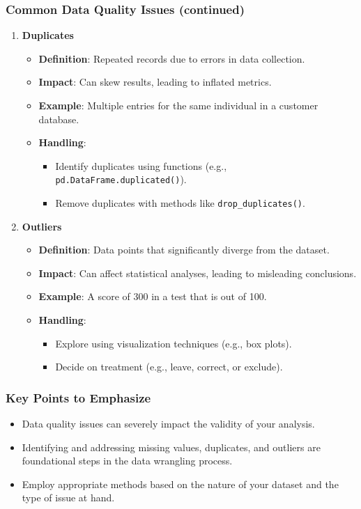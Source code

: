 \documentclass[aspectratio=169]{beamer}
\begin{document}
\begin{frame}[fragile]
    \frametitle{Common Data Quality Issues (continued)}
    \begin{enumerate}[resume]
        \item \textbf{Duplicates}
        \begin{itemize}
            \item \textbf{Definition}: Repeated records due to errors in data collection.
            \item \textbf{Impact}: Can skew results, leading to inflated metrics.
            \item \textbf{Example}: Multiple entries for the same individual in a customer database.
            \item \textbf{Handling}: 
                \begin{itemize}
                    \item Identify duplicates using functions (e.g., \texttt{pd.DataFrame.duplicated()}).
                    \item Remove duplicates with methods like \texttt{drop\_duplicates()}.
                \end{itemize}
        \end{itemize}

        \item \textbf{Outliers}
        \begin{itemize}
            \item \textbf{Definition}: Data points that significantly diverge from the dataset.
            \item \textbf{Impact}: Can affect statistical analyses, leading to misleading conclusions.
            \item \textbf{Example}: A score of 300 in a test that is out of 100.
            \item \textbf{Handling}: 
                \begin{itemize}
                    \item Explore using visualization techniques (e.g., box plots).
                    \item Decide on treatment (e.g., leave, correct, or exclude).
                \end{itemize}
        \end{itemize}
    \end{enumerate}
\end{frame}

\begin{frame}[fragile]
    \frametitle{Key Points to Emphasize}
    \begin{itemize}
        \item Data quality issues can severely impact the validity of your analysis.
        \item Identifying and addressing missing values, duplicates, and outliers are foundational steps in the data wrangling process.
        \item Employ appropriate methods based on the nature of your dataset and the type of issue at hand.
    \end{itemize}
\end{frame}
\end{document}
